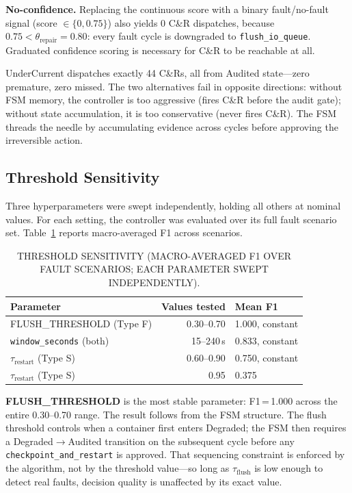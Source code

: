 \documentclass[conference]{IEEEtran}
\begin{document}
\textbf{No-confidence.} Replacing the continuous score with a binary fault/no-fault signal (score $\in \{0, 0.75\}$) also yields 0 C\&R dispatches, because $0.75 < \theta_{\mathrm{repair}} = 0.80$: every fault cycle is downgraded to \texttt{flush\_io\_queue}. Graduated confidence scoring is necessary for C\&R to be reachable at all.

UnderCurrent dispatches exactly 44 C\&Rs, all from Audited state---zero premature, zero missed. The two alternatives fail in opposite directions: without FSM memory, the controller is too aggressive (fires C\&R before the audit gate); without state accumulation, it is too conservative (never fires C\&R). The FSM threads the needle by accumulating evidence across cycles before approving the irreversible action.

\subsection{Threshold Sensitivity}
\label{sec:sensitivity}

Three hyperparameters were swept independently, holding all others at nominal values. For each setting, the controller was evaluated over its full fault scenario set. Table~\ref{tab:sensitivity} reports macro-averaged F1 across scenarios.

\begin{table}[t]
\caption{THRESHOLD SENSITIVITY (MACRO-AVERAGED F1 OVER FAULT SCENARIOS; EACH PARAMETER SWEPT INDEPENDENTLY).}
\label{tab:sensitivity}
\centering
\renewcommand{\arraystretch}{1.15}
\begin{tabular}{lrl}
\hline
\textbf{Parameter} & \textbf{Values tested} & \textbf{Mean F1} \\
\hline
FLUSH\_THRESHOLD (Type F) & 0.30--0.70 & 1.000, constant \\
\texttt{window\_seconds} (both)    & 15--240\,s & 0.833, constant \\
$\tau_{\mathrm{restart}}$ (Type S) & 0.60--0.90 & 0.750, constant \\
$\tau_{\mathrm{restart}}$ (Type S) & 0.95       & 0.375 \\
\hline
\end{tabular}
\end{table}

\textbf{FLUSH\_THRESHOLD} is the most stable parameter: F1\,=\,1.000 across the entire 0.30--0.70 range. The result follows from the FSM structure. The flush threshold controls when a container first enters Degraded; the FSM then requires a Degraded$\rightarrow$Audited transition on the subsequent cycle before any \texttt{checkpoint\_and\_restart} is approved. That sequencing constraint is enforced by the algorithm, not by the threshold value---so long as $\tau_{\mathrm{flush}}$ is low enough to detect real faults, decision quality is unaffected by its exact value.
\end{document}
